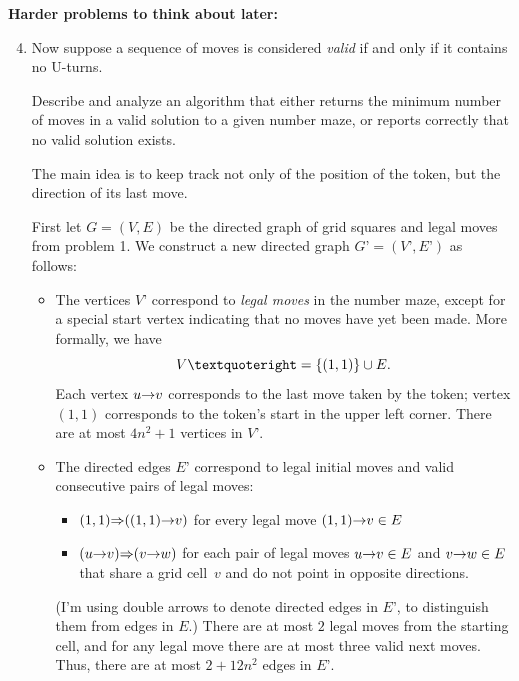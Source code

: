 \documentclass[11pt]{article}
\begin{document}
\newpage

\bigskip
\noindent
\textbf{Harder problems to think about later:}

\begin{enumerate}
\setcounter{enumi}{3}
\parindent 1.5em \itemsep 2ex

\def\arcTo{\mathord{\Rightarrow}}
\item
Now suppose a sequence of moves is considered \emph{valid} if and only if it contains no U-turns.

Describe and analyze an algorithm that either returns the minimum number of moves in a valid solution to a given number maze, or reports correctly that no valid solution exists.

\begin{Solution}
The main idea is to keep track not only of the position of the token, but the direction of its last move.

First let $G=(V,E)$ be the directed graph of grid squares and legal moves from problem 1.  We construct a new directed graph $G’ = (V’, E’)$ as follows:
\begin{itemize}
\item
The vertices $V’$ correspond to \emph{legal moves} in the number maze, except for a special start vertex indicating that no moves have yet been made.  More formally, we have
\[
	V’ = \set{(1,1)} \cup E.
\]
Each vertex $u\mathord{\rightarrow} v$ corresponds to the last move taken by the token; vertex $(1,1)$ corresponds to the token’s start in the upper left corner.  There are at most $4n^2 + 1$ vertices in $V’$.

\item
The directed edges $E’$ correspond to legal initial moves and valid consecutive pairs of legal moves:
\begin{itemize}
\item $(1,1)\arcTo((1,1)\arcto v)$ for every legal move $(1,1)\mathord{\rightarrow} v\in E$
\item $(u\arcto v)\arcTo(v\arcto w)$ for each pair of legal moves $u\mathord{\rightarrow} v\in E$ and $v\mathord{\rightarrow} w\in E$ that share a grid cell~$v$ and do not point in opposite directions.
\end{itemize}
(I’m using double arrows to denote directed edges in $E’$, to distinguish them from edges in $E$.)  There are at most $2$ legal moves from the starting cell, and for any legal move there are at most three valid next moves.  Thus, there are at most $2 + 12n^2$ edges in $E’$.


\end{itemize}
\end{Solution}
\end{enumerate}
\end{document}
